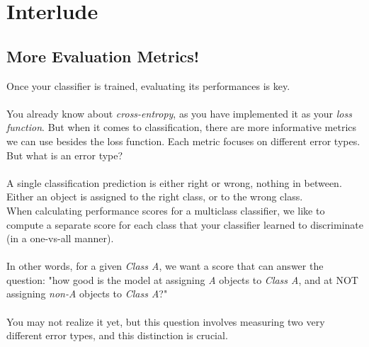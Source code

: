 
\section*{Interlude}
\subsection*{More Evaluation Metrics!}
Once your classifier is trained, evaluating its performances is key.\\
\\
You already know about \textit{cross-entropy}, as you have implemented it as your \textit{loss function}.
But when it comes to classification, there are more informative metrics we can use besides the loss function.
Each metric focuses on different error types.  
But what is an error type?\\
\\
A single classification prediction is either right or wrong, nothing in between.
Either an object is assigned to the right class, or to the wrong class.\\
When calculating performance scores for a multiclass classifier, we like to compute a 
separate score for each class that your classifier learned to discriminate (in a one-vs-all manner).\\
\\
In other words, for a given \textit{Class A}, we want a score that can answer the question: "how good is 
the model at assigning \textit{A} objects to \textit{Class A}, and at NOT assigning 
\textit{non-A} objects to \textit{Class A}?" \\
\\
You may not realize it yet, but this question involves measuring two 
very different error types, and this distinction is crucial.\\
\newpage
